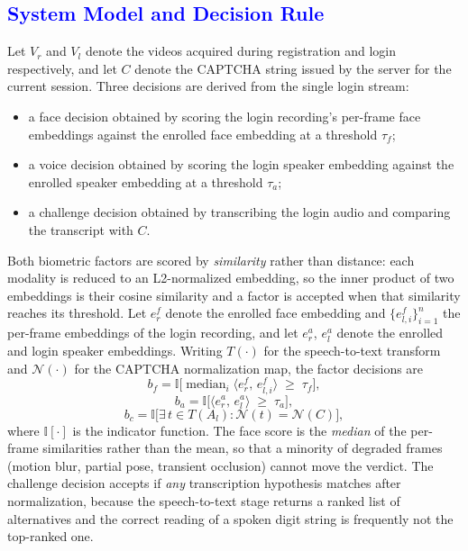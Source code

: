\documentclass[10pt,journal,compsoc]{IEEEtran}
\begin{document}
{\color{blue}
\subsection{\textcolor{blue}{System Model and Decision Rule}}\label{sec:model}
Let $V_r$ and $V_l$ denote the videos acquired during registration and login respectively, and let $C$ denote the CAPTCHA string issued by the server for the current session. Three decisions are derived from the single login stream:
\begin{itemize}
    \item a face decision obtained by scoring the login recording's per-frame face embeddings against the enrolled face embedding at a threshold $\tau_f$;
    \item a voice decision obtained by scoring the login speaker embedding against the enrolled speaker embedding at a threshold $\tau_a$;
    \item a challenge decision obtained by transcribing the login audio and comparing the transcript with $C$.
\end{itemize}
Both biometric factors are scored by \emph{similarity} rather than distance: each modality is reduced to an L2-normalized embedding, so the inner product of two embeddings is their cosine similarity and a factor is accepted when that similarity reaches its threshold. Let $e_r^{f}$ denote the enrolled face embedding and $\{e_{l,i}^{f}\}_{i=1}^{n}$ the per-frame embeddings of the login recording, and let $e_r^{a}$, $e_l^{a}$ denote the enrolled and login speaker embeddings. Writing $T(\cdot)$ for the speech-to-text transform and $\mathcal{N}(\cdot)$ for the CAPTCHA normalization map, the factor decisions are
\begin{equation}
b_f = \mathbb{I}\Big[\operatorname{median}_{i}\big\langle e_r^{f},\, e_{l,i}^{f}\big\rangle \;\geq\; \tau_f\Big],
\label{eq:face}
\end{equation}
\begin{equation}
b_a = \mathbb{I}\Big[\big\langle e_r^{a},\, e_l^{a}\big\rangle \;\geq\; \tau_a\Big],
\label{eq:voice}
\end{equation}
\begin{equation}
b_c = \mathbb{I}\Big[\exists\, t \in T(A_l): \mathcal{N}(t) = \mathcal{N}(C)\Big],
\label{eq:captcha}
\end{equation}
where $\mathbb{I}[\cdot]$ is the indicator function. The face score is the \emph{median} of the per-frame similarities rather than the mean, so that a minority of degraded frames (motion blur, partial pose, transient occlusion) cannot move the verdict. The challenge decision accepts if \emph{any} transcription hypothesis matches after normalization, because the speech-to-text stage returns a ranked list of alternatives and the correct reading of a spoken digit string is frequently not the top-ranked one.
}
\end{document}
